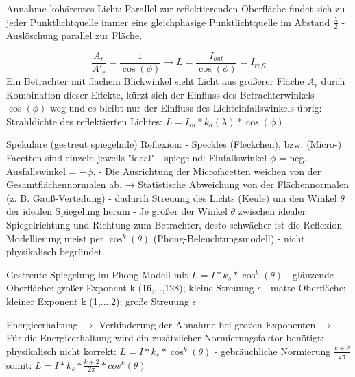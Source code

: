 \documentclass[10pt,landscape]{article}
\begin{document}
\begin{multicols}{3}

Annahme kohärentes Licht: Parallel zur reflektierenden Oberfläche findet sich zu jeder Punktlichtquelle immer eine gleichphasige Punktlichtquelle im Abstand $\frac{\lambda}{2}$
- Auslöschung parallel zur Fläche,


$$\frac{A_r}{A'_r}=\frac{1}{\cos(\phi)} \rightarrow L=\frac{I_{out}}{\cos(\phi)}=I_{refl}$$
Ein Betrachter mit flachem Blickwinkel sieht Licht aus größerer Fläche $A_r$ durch Kombination dieser Effekte, kürzt sich der Einfluss des Betrachterwinkels $\cos(\phi)$ weg und es bleibt nur der Einfluss des Lichteinfallswinkels übrig: Strahldichte des reflektierten Lichtes: $L=I_{in}*k_d(\lambda)*\cos(\phi)$

Spekuläre (gestreut spiegelnde) Reflexion:
- Speckles (Fleckchen), bzw. (Micro-) Facetten sind einzeln jeweils "ideal"
- spiegelnd: Einfallswinkel $\phi$ = neg. Ausfallswinkel = $-\phi$.
- Die Ausrichtung der Microfacetten weichen von der Gesamtflächennormalen ab. → Statistische Abweichung von der Flächennormalen (z. B. Gauß-Verteilung)
- dadurch Streuung des Lichts (Keule) um den Winkel $\theta$ der idealen Spiegelung herum
- Je größer der Winkel $\theta$ zwischen idealer Spiegelrichtung und Richtung zum Betrachter, desto schwächer ist die Reflexion
- Modellierung meist per $\cos^k(\theta)$ (Phong-Beleuchtungsmodell) - nicht physikalisch begründet.


Gestreute Spiegelung im Phong Modell mit $L=I*k_s*\cos^k(\theta)$
- glänzende Oberfläche: großer Exponent k (16,...,128); kleine Streuung $\epsilon$
- matte Oberfläche: kleiner Exponent k (1,...,2); große Streuung $\epsilon$

Energieerhaltung $\rightarrow$ Verhinderung der Abnahme bei großen Exponenten $\rightarrow$ Für die Energieerhaltung wird ein zusätzlicher Normierungsfaktor benötigt:
- physikalisch nicht korrekt:  $L=I*k_s*\cos^k(\theta)$
- gebräuchliche Normierung $\frac{k+2}{2\pi}$ somit: $L=I*k_s*\frac{k+2}{2\pi}*cos^k(\theta)$


\end{multicols}
\end{document}
